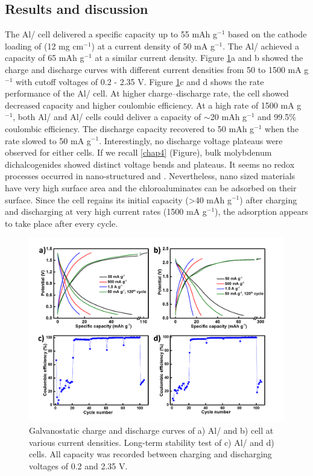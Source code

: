 \subsection{Results and discussion}
The Al/ cell delivered a specific capacity up to 55 mAh g$^{-1}$ based on the cathode loading of  (12 mg cm$^{-1}$) at a current density of 50 mA g$^{-1}$. The Al/ achieved a  capacity of 65 mAh g$^{-1}$ at a similar current density. Figure \ref{Figures/chap6fig:MoX2YNCDCsCEs}a and b showed the charge and discharge curves with different current densities from 50 to 1500 mA g$^{-1}$ with cutoff voltages of 0.2 - 2.35 V. Figure \ref{Figures/chap6fig:MoX2YNCDCsCEs}c and d shows the rate performance of the Al/ cell. At higher charge–discharge rate, the cell showed decreased capacity and higher coulombic efficiency. At a high rate of 1500 mA g$^{-1}$, both Al/ and Al/ cells could deliver a capacity of $\sim$20 mAh g$^{-1}$ and 99.5\% coulombic efficiency. The discharge capacity recovered to 50 mAh g$^{-1}$ when the rate slowed to 50 mA g$^{-1}$. Interestingly, no discharge voltage plateaus were observed for either cells. If we recall \ref{chap4} (Figure), bulk molybdenum dichalcogenides showed distinct voltage bends and plateaus. It seems no redox processes occurred in nano-structured  and . Nevertheless, nano sized materials have very high surface area and the chloroaluminates can be adsorbed on their surface. Since the cell regains its initial capacity (>40 mAh g$^{-1}$) after charging and discharging at very high current rates (1500 mA g$^{-1}$), the adsorption appears to take place after every cycle.  

\begin{figure}[h!]
  \centering
  \includegraphics[width=\textwidth]{Figures/chap6fig/MoX2YNCDCsCEs}
    \caption{Galvanostatic charge and discharge curves of a) Al/ and b)  cell at various current densities. Long-term stability test of c) Al/ and d)  cells. All capacity was recorded between charging and discharging voltages of 0.2 and 2.35 V.}
  \label{Figures/chap6fig:MoX2YNCDCsCEs}
\end{figure}

